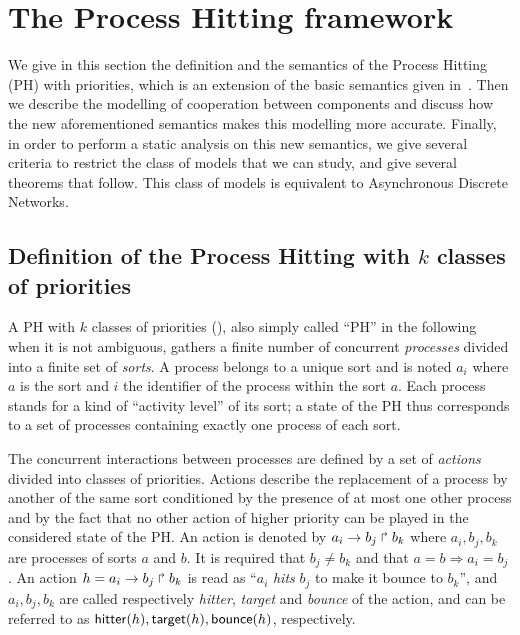\section{The Process Hitting framework}

We give in this section the definition and the semantics of the Process Hitting (PH) with priorities, which is an extension of the basic semantics given in~\cite{PMR10-TCSB}.
Then we describe the modelling of cooperation between components and discuss how the new aforementioned semantics makes this modelling more accurate.
Finally, in order to perform a static analysis on this new semantics, we give several criteria to restrict the class of models that we can study,
and give several theorems that follow.
This class of models is equivalent to Asynchronous Discrete Networks.

\subsection{Definition of the Process Hitting with $k$ classes of priorities}
\label{ssec:PH}
A PH with $k$ classes of priorities (), also simply called “PH” in the following when it is not ambiguous, gathers a finite number of concurrent \emph{processes} divided into a finite set of \emph{sorts}.
A process belongs to a unique sort and is noted $a_i$ where $a$ is the sort and $i$ the identifier of the process within the sort $a$.
Each process stands for a kind of “activity level” of its sort; a state of the PH thus corresponds to a set of processes containing exactly one process of each sort.

The concurrent interactions between processes are defined by a set of \emph{actions} divided into classes of priorities.
Actions describe the replacement of a process by another of the same sort conditioned by the presence of at most one other process and by the fact that no other action of higher priority can be played in the considered state of the PH.
An action is denoted by $a_i\rightarrow b_j\Rsh b_k$ where $a_i,b_j,b_k$ are processes of sorts $a$ and $b$.
It is required that $b_j \neq b_k$ and that $a=b\Rightarrow a_i=b_j$.
An action $h=a_i\rightarrow b_j\Rsh b_k$ is read as ``$a_i$ \emph{hits} $b_j$ to make it bounce to $b_k$'', and $a_i,b_j,b_k$ are called respectively \emph{hitter}, \emph{target} and \emph{bounce} of the action, and can be referred to as $\mathsf{hitter}(h), \mathsf{target}(h), \mathsf{bounce}(h)$, respectively.

